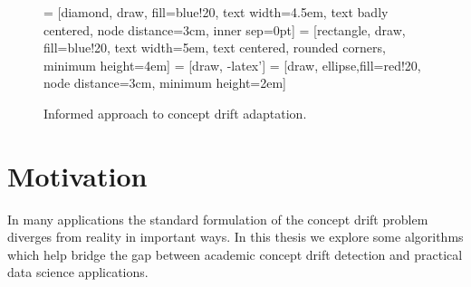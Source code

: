 \begin{figure}
    \centering
    
     = [diamond, draw, fill=blue!20, 
        text width=4.5em, text badly centered, node distance=3cm, inner sep=0pt]
     = [rectangle, draw, fill=blue!20, 
        text width=5em, text centered, rounded corners, minimum height=4em]
     = [draw, -latex']
     = [draw, ellipse,fill=red!20, node distance=3cm,
        minimum height=2em]
    
    \caption{Informed approach to concept drift adaptation.}
    \label{fig:standard_adaptation}
\end{figure}

\section{Motivation}

In many applications the standard formulation of the concept drift problem diverges from reality in important ways. In this thesis we explore some algorithms which help bridge the gap between academic concept drift detection and practical data science applications. %

